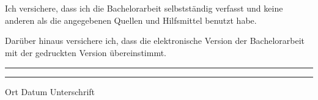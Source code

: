 
\chapter*{}

Ich versichere, dass ich die Bachelorarbeit selbstständig verfasst und keine anderen als die angegebenen Quellen und Hilfsmittel benutzt habe.

Darüber hinaus versichere ich, dass die elektronische Version der Bachelorarbeit mit der gedruckten Version übereinstimmt.

\vspace{50pt}
\noindent\rule{5cm}{.4pt}\hfill\rule{5cm}{.4pt}\par
\noindent Ort Datum \hfill Unterschrift


